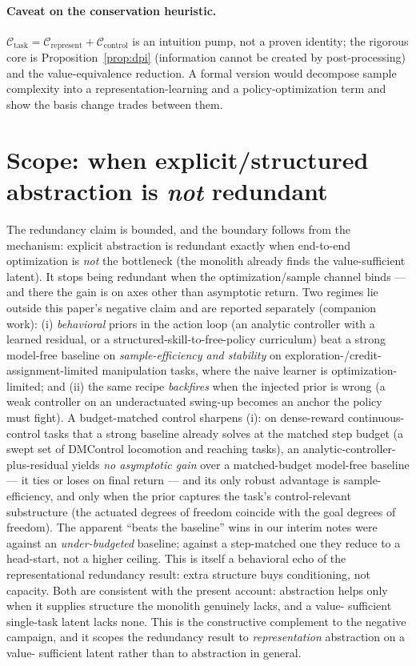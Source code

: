 \paragraph{Caveat on the conservation heuristic.}
$\mathcal{C}_{\text{task}}=\mathcal{C}_{\text{represent}}+\mathcal{C}_{\text{control}}$ is an
intuition pump, not a proven identity; the rigorous core is Proposition~\ref{prop:dpi}
(information cannot be created by post-processing) and the value-equivalence reduction. A formal
version would decompose sample complexity into a representation-learning and a
policy-optimization term and show the basis change trades between them.

\section{Scope: when explicit/structured abstraction is \emph{not} redundant}
\label{sec:scope}

The redundancy claim is bounded, and the boundary follows from the mechanism:
explicit abstraction is redundant exactly when end-to-end optimization is \emph{not} the
bottleneck (the monolith already finds the value-sufficient latent). It stops being redundant
when the optimization/sample channel binds --- and there the gain is on axes other than asymptotic
return. Two regimes lie outside this paper's negative claim and are reported separately
(companion work): (i) \emph{behavioral} priors in the action loop (an analytic controller with a
learned residual, or a structured-skill-to-free-policy curriculum) beat a strong model-free
baseline on \emph{sample-efficiency and stability} on exploration-/credit-assignment-limited
manipulation tasks, where the naive learner is optimization-limited; and (ii) the same recipe
\emph{backfires} when the injected prior is wrong (a weak controller on an underactuated
swing-up becomes an anchor the policy must fight). A budget-matched control sharpens (i): on
dense-reward continuous-control tasks that a strong baseline already solves at the matched step
budget (a swept set of DMControl locomotion and reaching tasks), an analytic-controller-plus-residual
yields \emph{no asymptotic gain} over a matched-budget model-free baseline --- it ties or loses on
final return --- and its only robust advantage is sample-efficiency, and only when the prior captures
the task's control-relevant substructure (the actuated degrees of freedom coincide with the goal
degrees of freedom). The apparent ``beats the baseline'' wins in our interim notes were against an
\emph{under-budgeted} baseline; against a step-matched one they reduce to a head-start, not a higher
ceiling. This is itself a behavioral echo of the representational redundancy result: extra structure
buys conditioning, not capacity. Both are consistent with the present account:
abstraction helps only when it supplies structure the monolith genuinely lacks, and a value-
sufficient single-task latent lacks none. This is the constructive complement to the negative
campaign, and it scopes the redundancy result to \emph{representation} abstraction on a value-
sufficient latent rather than to abstraction in general.
